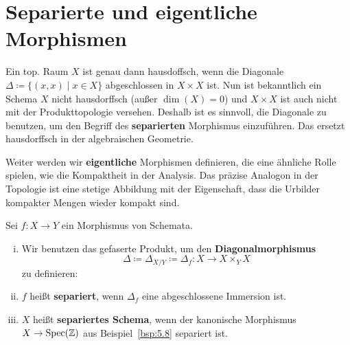 
\chapter{Separierte und eigentliche Morphismen}
\label{chap:10}
Ein top. Raum $X$ ist genau dann hausdoffsch, wenn die Diagonale $\Delta \coloneqq \{(x,x) \mid x \in X\}$ abgeschlossen in $X \times X$ ist. Nun ist bekanntlich ein Schema $X$ nicht hausdorffsch (außer $\dim(X) = 0$) und $X\times X$ ist auch nicht mit der Produkttopologie versehen. Deshalb ist es sinnvoll, die Diagonale zu benutzen, um den Begriff des \textbf{separierten} Morphismus einzuführen. Das ersetzt hausdorffsch in der algebraischen Geometrie.

Weiter werden wir \textbf{eigentliche} Morphismen definieren, die eine ähnliche Rolle spielen, wie die Kompaktheit in der Analysis. Das präzise Analogon in der Topologie ist eine stetige Abbildung mit der Eigenschaft, dass die Urbilder kompakter Mengen wieder kompakt sind.

\begin{defn}
\label{defn:10.1} Sei $f \colon X \to Y$ ein Morphismus von Schemata.
	\begin{enumerate}[i)]
		\item\label{defn:10.1:i} Wir benutzen das gefaserte Produkt, um den \textbf{Diagonalmorphismus}
		\[
			\Delta\coloneqq \Delta_{X/Y} \coloneqq \Delta_f \colon X \to X \times_Y X
		\]
		zu definieren:
		\begin{center}
		\end{center}
		\item\label{defn:10.1:ii} $f$ heißt \textbf{separiert}, wenn $\Delta_f$ eine abgeschlossene Immersion ist.
		\item\label{defn:10.1:iii} $X$ heißt \textbf{separiertes Schema}, wenn der kanonische Morphismus $X \to \operatorname{Spec}(\mathbb {Z})$ aus Beispiel~\ref{bsp:5.8} separiert ist.
	\end{enumerate}
\end{defn}

